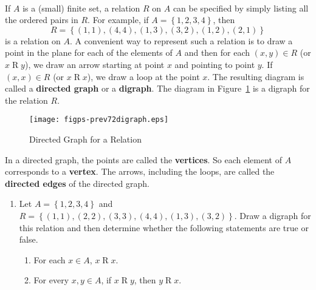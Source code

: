 \begin{previewactivity} \label{PA:directedgraphs} \hfill \\
If  $A$  is a (small) finite set, a relation  $R$  on  $A$  can be specified by simply listing all the ordered pairs in  $R$.  For example,  if  $A = \left\{ {1, 2, 3, 4} \right\}$, then 
\[
R = \left\{ {( {1, 1} ), ( {4, 4} ), ( {1, 3} ), ( {3, 2} ), ( {1, 2} ), ( {2, 1} )} \right\}
\]
is a relation  on  $A$.  A convenient way to represent such a relation is to draw a point in the plane for each of the elements of  $A$  and then for each  $\left( {x, y} \right) \in R$ (or  
$x \mathrel{R} y$),  we draw an arrow starting at point $x$  and pointing to point $y$.  If  
$\left( {x, x} \right) \in R$ (or  $x \mathrel{R} x$), we draw a loop at the point  $x$.  The resulting diagram is called a \textbf{directed graph} \label{directedgraph}
%
 or a \textbf{digraph}.
%
  The diagram in Figure~\ref{fig:dirgraph} is a digraph for the relation  $R$.

\begin{figure}[h]
\begin{center}
\texttt{[image: figps-prev72digraph.eps]}
\caption{Directed Graph for a Relation} \label{fig:dirgraph}
\end{center}
\end{figure}

In a directed graph, the points are called the \textbf{vertices}.  So each element of  $A$  corresponds to a \textbf{vertex}.
%
%
  The arrows, including the loops, are called the \textbf{directed edges}
%
%
 of the directed graph.

\begin{enumerate}
\item Let  $A = \left\{ {1, 2, 3, 4} \right\}$ and  
$R = \left\{ {( {1, 1} ), ( {2, 2} ), ( {3, 3} ), ( {4, 4} ), ( {1, 3} ), ( {3, 2} )} \right\}$.  Draw a digraph for this relation and then determine whether the following statements are true or false.  \label{PA:directedgraphs1}

\begin{enumerate}
  \item For each  $x \in A$,  $x \mathrel{R} x$.

  \item For every  $x, y \in A$, if  $x \mathrel{R} y$, then  $y \mathrel{R} x$.


\end{enumerate}
\end{enumerate}
\end{previewactivity}
